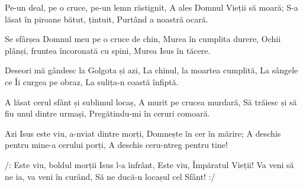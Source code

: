 \beginverse
Pe-un deal, pe o cruce, pe-un lemn răstignit,
A ales Domnul Vieții să moară;
S-a lăsat în piroane bătut, țintuit,
Purtând a noastră ocară.
\endverse

\beginchorus
Se sfârșea Domnul meu pe o cruce de chin,
Murea în cumplita durere,
Ochii plânși, fruntea încoronată cu spini,
Murea Isus în tăcere.
\endchorus

\beginverse
Deseori mă gândesc la Golgota și azi,
La chinul, la moartea cumplită,
La sângele ce Îi curgea pe obraz,
La sulița-n coastă înfiptă.
\endverse

\beginverse
A lăsat cerul sfânt și sublimul locaș,
A murit pe crucea murdară,
Să trăiesc și să fiu unul dintre urmași,
Pregătindu-mi în ceruri comoară.
\endverse

\beginverse
Azi Isus este viu, a-nviat dintre morți,
Domnește în cer în mărire;
A deschis pentru mine-a cerului porți,
A deschis ceru-ntreg pentru tine!
\endverse

\beginchorus
/: Este viu, boldul morții Isus l-a înfrânt,
Este viu, Împăratul Vieții!
Va veni să ne ia, va veni în curând,
Să ne ducă-n locașul cel Sfânt! :/
\endchorus
\endsong